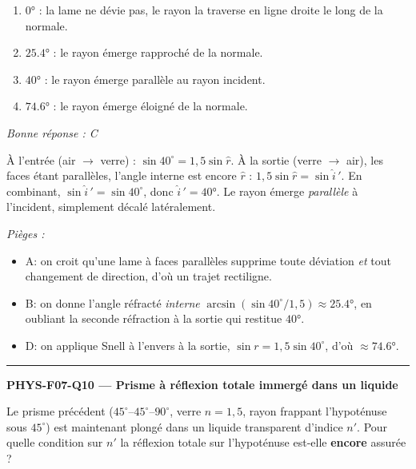 \documentclass[11pt,a4paper]{article}
\begin{document}
\begin{enumerate}[label=\Alph*)]
\item $\ang{0}$ : la lame ne dévie pas, le rayon la traverse en ligne droite le long de la normale.
\item $\ang{25.4}$ : le rayon émerge rapproché de la normale.
\item $\ang{40}$ : le rayon émerge parallèle au rayon incident.
\item $\ang{74.6}$ : le rayon émerge éloigné de la normale.
\end{enumerate}
\textit{Bonne réponse : C}\par
À l'entrée (air $\to$ verre) : $\sin 40^\circ = 1{,}5\sin\hat r$. À la sortie (verre $\to$ air), les faces étant parallèles, l'angle interne est encore $\hat r$ : $1{,}5\sin\hat r = \sin\hat i{\,}'$. En combinant, $\sin\hat i{\,}'=\sin 40^\circ$, donc $\hat i{\,}'=\ang{40}$. Le rayon émerge \emph{parallèle} à l'incident, simplement décalé latéralement.\par
\textit{Pièges :}
\begin{itemize}
\item A: on croit qu'une lame à faces parallèles supprime toute déviation \emph{et} tout changement de direction, d'où un trajet rectiligne.
\item B: on donne l'angle réfracté \emph{interne} $\arcsin(\sin 40^\circ/1{,}5)\approx\ang{25.4}$, en oubliant la seconde réfraction à la sortie qui restitue $\ang{40}$.
\item D: on applique Snell à l'envers à la sortie, $\sin r = 1{,}5\sin 40^\circ$, d'où $\approx\ang{74.6}$.
\end{itemize}
\vspace{8pt}\hrule\vspace{8pt}

\noindent\textbf{PHYS-F07-Q10 --- Prisme à réflexion totale immergé dans un liquide}\par
Le prisme précédent ($45^\circ$--$45^\circ$--$90^\circ$, verre $n=1{,}5$, rayon frappant l'hypoténuse sous $45^\circ$) est maintenant plongé dans un liquide transparent d'indice $n'$. Pour quelle condition sur $n'$ la réflexion totale sur l'hypoténuse est-elle \textbf{encore} assurée ?
\end{document}
